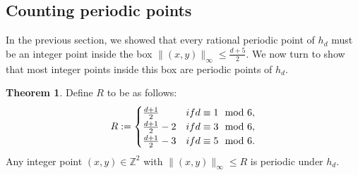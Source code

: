 \documentclass[12pt]{amsart}
\theoremstyle{definition}
\newtheorem{theorem}{Theorem}[section]
\begin{document}
\subsection{Counting periodic points}
In the previous section, we showed that every rational periodic point of $h_d$ must be an integer point inside the box $\|(x,y)\|_{\infty} \leq \frac{d+5}{2}$. We now turn to show that most integer points inside this box are periodic points of $h_d$.
\begin{theorem}
    Define $R$ to be as follows:
    \begin{equation*}
        R:=\begin{cases}
            \frac{d+1}{2}  & \textnormal{if } d\equiv 1 \mod 6 ,\\
            \frac{d+1}{2} - 2& \textnormal{if } d\equiv 3\mod 6 ,\\
            \frac{d+1}{2} -3 & \textnormal{if } d\equiv 5\mod 6 .
        \end{cases}
    \end{equation*}
    Any integer point $(x,y)\in \mathbb{Z}^2$ with $\|(x,y)\|_{\infty} \leq R$ is periodic under $h_d$.
\end{theorem}
\end{document}
